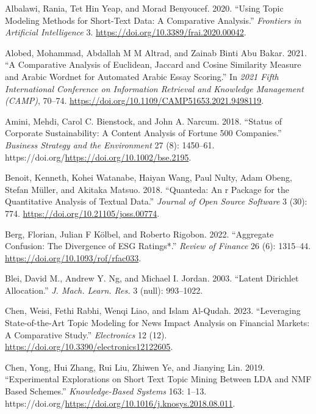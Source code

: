 \documentclass[
]{article}
\newlength{\cslhangindent}
\newlength{\cslentryspacingunit} %
\newenvironment{CSLReferences}[2] %
 {%
  \setlength{\parindent}{0pt}
  \ifodd #1
  \let\oldpar\par
  \def\par{\hangindent=\cslhangindent\oldpar}
  \fi
  \setlength{\parskip}{#2\cslentryspacingunit}
 }%
 {}
\begin{document}
\hypertarget{refs}{}
\begin{CSLReferences}{1}{0}
\leavevmode{}%
Albalawi, Rania, Tet Hin Yeap, and Morad Benyoucef. 2020. {``Using Topic Modeling Methods for Short-Text Data: A Comparative Analysis.''} \emph{Frontiers in Artificial Intelligence} 3. \url{https://doi.org/10.3389/frai.2020.00042}.

\leavevmode{}%
Alobed, Mohammad, Abdallah M M Altrad, and Zainab Binti Abu Bakar. 2021. {``A Comparative Analysis of Euclidean, Jaccard and Cosine Similarity Measure and Arabic Wordnet for Automated Arabic Essay Scoring.''} In \emph{2021 Fifth International Conference on Information Retrieval and Knowledge Management (CAMP)}, 70--74. \url{https://doi.org/10.1109/CAMP51653.2021.9498119}.

\leavevmode{}%
Amini, Mehdi, Carol C. Bienstock, and John A. Narcum. 2018. {``Status of Corporate Sustainability: A Content Analysis of Fortune 500 Companies.''} \emph{Business Strategy and the Environment} 27 (8): 1450--61. https://doi.org/\url{https://doi.org/10.1002/bse.2195}.

\leavevmode{}%
Benoit, Kenneth, Kohei Watanabe, Haiyan Wang, Paul Nulty, Adam Obeng, Stefan Müller, and Akitaka Matsuo. 2018. {``Quanteda: An r Package for the Quantitative Analysis of Textual Data.''} \emph{Journal of Open Source Software} 3 (30): 774. \url{https://doi.org/10.21105/joss.00774}.

\leavevmode{}%
Berg, Florian, Julian F Kölbel, and Roberto Rigobon. 2022. {``{Aggregate Confusion: The Divergence of ESG Ratings*}.''} \emph{Review of Finance} 26 (6): 1315--44. \url{https://doi.org/10.1093/rof/rfac033}.

\leavevmode{}%
Blei, David M., Andrew Y. Ng, and Michael I. Jordan. 2003. {``Latent Dirichlet Allocation.''} \emph{J. Mach. Learn. Res.} 3 (null): 993--1022.

\leavevmode{}%
Chen, Weisi, Fethi Rabhi, Wenqi Liao, and Islam Al-Qudah. 2023. {``Leveraging State-of-the-Art Topic Modeling for News Impact Analysis on Financial Markets: A Comparative Study.''} \emph{Electronics} 12 (12). \url{https://doi.org/10.3390/electronics12122605}.

\leavevmode{}%
Chen, Yong, Hui Zhang, Rui Liu, Zhiwen Ye, and Jianying Lin. 2019. {``Experimental Explorations on Short Text Topic Mining Between LDA and NMF Based Schemes.''} \emph{Knowledge-Based Systems} 163: 1--13. https://doi.org/\url{https://doi.org/10.1016/j.knosys.2018.08.011}.


\end{CSLReferences}
\end{document}
